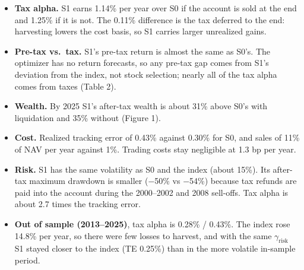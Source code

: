 \documentclass[
  11pt,
]{article}
\providecommand{\tightlist}{%
  \setlength{\itemsep}{0pt}\setlength{\parskip}{0pt}}
\begin{document}
\begin{itemize}
\tightlist
\item
  \textbf{Tax alpha.} S1 earns 1.14\% per year over S0 if the account is sold at the end and 1.25\% if it is not. The 0.11\% difference is the tax deferred to the end: harvesting lowers the cost basis, so S1 carries larger unrealized gains.
\item
  \textbf{Pre-tax vs.~tax.} S1's pre-tax return is almost the same as S0's. The optimizer has no return forecasts, so any pre-tax gap comes from S1's deviation from the index, not stock selection; nearly all of the tax alpha comes from taxes (Table
  2).
\item
  \textbf{Wealth.} By 2025 S1's after-tax wealth is about 31\% above S0's with liquidation and 35\% without (Figure 1).
\item
  \textbf{Cost.} Realized tracking error of 0.43\% against 0.30\% for S0, and sales of 11\% of NAV per year against 1\%. Trading costs stay negligible at 1.3 bp per year.
\item
  \textbf{Risk.} S1 has the same volatility as S0 and the index (about 15\%). Its after-tax maximum drawdown is smaller (−50\% vs −54\%) because tax refunds are paid into the account during the 2000--2002 and 2008 sell-offs. Tax alpha is about 2.7
  times the tracking error.
\item
  \textbf{Out of sample (2013--2025)}, tax alpha is 0.28\% / 0.43\%. The index rose 14.8\% per year, so there were few losses to harvest, and with the same \(\gamma_{\text{risk}}\) S1 stayed closer to the index (TE 0.25\%) than in the more volatile
  in-sample period.
\end{itemize}
\end{document}
